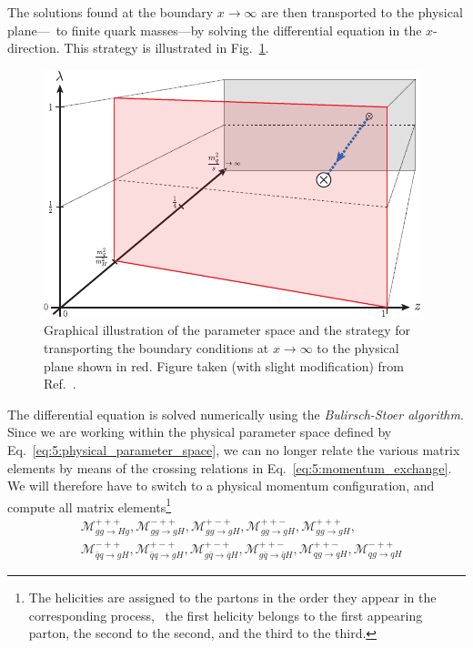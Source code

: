 The solutions found at the boundary $x \rightarrow \infty$ are then transported to the physical plane---\ie\ to finite quark masses---by solving the differential equation in the $x$-direction. This strategy is illustrated in Fig.~\ref{fig:5:integration3D}.
\begin{figure}[h]
\centering
\includegraphics[width=\figurewidth]{Images/integration3D_no_threshold.pdf}
\caption{Graphical illustration of the parameter space and the strategy for transporting the boundary conditions at $x \rightarrow \infty$ to the physical plane shown in red. Figure taken (with slight modification) from Ref.~\cite{Niggetiedt:2023ywb}.}
\label{fig:5:integration3D}
\end{figure}
The differential equation is solved numerically using the \textit{Bulirsch-Stoer algorithm}. Since we are working within the physical parameter space defined by Eq.~\eqref{eq:5:physical_parameter_space}, we can no longer relate the various matrix elements by means of the crossing relations in Eq.~\eqref{eq:5:momentum_exchange}. We will therefore have to switch to a physical momentum configuration, and compute all matrix elements\footnote{The helicities are assigned to the partons in the order they appear in the corresponding process, \ie\ the first helicity belongs to the first appearing parton, the second to the second, and the third to the third.}
\begin{equation}
\begin{split}
&\mathcal{M}_{gg \rightarrow H g}^{+++}, \mathcal{M}_{gg \rightarrow g H }^{-++}, \mathcal{M}_{gg \rightarrow gH}^{+-+}, \mathcal{M}_{gg \rightarrow gH}^{++-}, \mathcal{M}_{gg \rightarrow gH }^{+++}, \\
&\mathcal{M}_{\bar{q} q \rightarrow gH }^{-++}, \mathcal{M}_{\bar{q} q \rightarrow gH }^{+-+}, \mathcal{M}_{g\bar{q} \rightarrow \bar{q}H}^{+-+}, \mathcal{M}_{g\bar{q} \rightarrow \bar{q}H}^{++-}, \mathcal{M}_{qg \rightarrow q H}^{++-}, \mathcal{M}_{qg \rightarrow q H}^{-++}
\end{split}
\end{equation}
